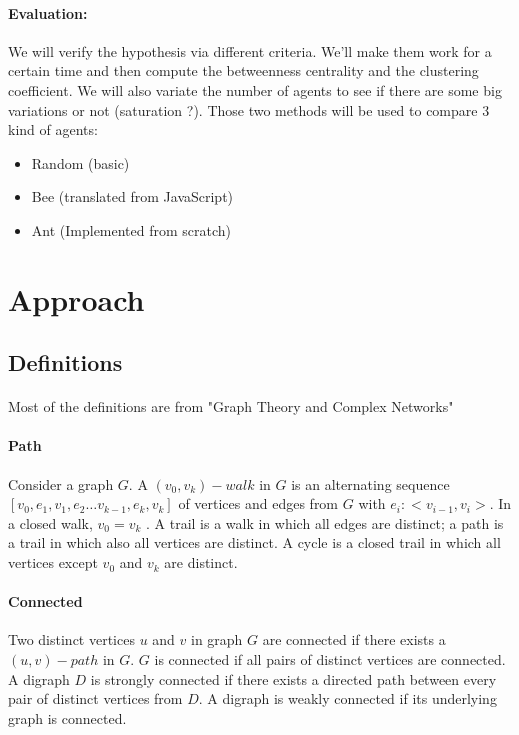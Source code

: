 \documentclass{article}
\newenvironment{itemh}[0]{\begin{itemize}[label=$\heartsuit$, font=\color{mygray} \small]}{\end{itemize}}
\begin{document}
		\paragraph{Evaluation:}
			We will verify the hypothesis via different criteria.
			We'll make them work for a certain time and then compute the betweenness centrality and the clustering coefficient.
			We will also variate the number of agents to see if there are some big variations or not (saturation ?).
			Those two methods will be used to compare 3 kind of agents:
		\begin{itemh}
			\item Random (basic)
			\item Bee (translated from JavaScript)
			\item Ant (Implemented from scratch)
		\end{itemh}

\newpage
\section{Approach}
	\subsection{Definitions}
		\paragraph{}
			Most of the definitions are from "Graph Theory and Complex Networks"\cite{Steen10}
		\paragraph{Path}
			Consider a graph $G$.
			A $(v_0 , v_k)-walk$ in $G$ is an alternating sequence $[ v_0 , e_1 , v_1 , e_2 \dots v_{k-1} , e_k , v_k ]$ of vertices
			and edges from $G$ with $e_i : <v_{i-1},v_i>$.
			In a closed walk, $v_0 = v_k$ .
			A trail is a walk in which all edges are distinct; a path is a trail in which also all vertices are distinct.
			A cycle is a closed trail in which all vertices except $v_0$ and $v_k$ are distinct.
		\paragraph{Connected}
			Two distinct vertices $u$ and $v$ in graph $G$ are connected if there exists a $(u,v) - path$ in $G$.
			$G$ is connected if all pairs of distinct vertices are connected.
			A digraph $D$ is strongly connected if there exists a directed path between every pair of distinct vertices from $D$.
			A digraph is weakly connected if its underlying graph is connected.
\end{document}

